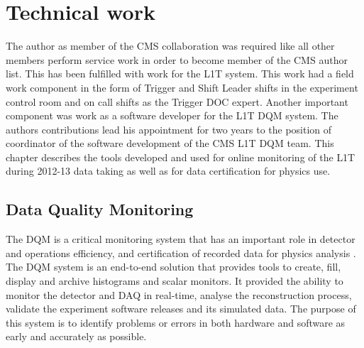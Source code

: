 \chapter{Technical work}
\label{CHAPTER:TechnicalWork}

\glsresetall %


The author as member of the \gls{CMS} collaboration was required like all other members perform service work in order to become member of the \gls{CMS} author list. This has been fulfilled with work for the \gls{L1T} system. This work had a field work component in the form of Trigger and Shift Leader shifts in the experiment control room and on call shifts as the Trigger \gls{DOC} expert. Another important component was work as a software developer for the \gls{L1T} \gls{DQM} system. The authors contributions lead his appointment for two years  to the position of coordinator of the software development of the \gls{CMS} \gls{L1T} \gls{DQM} team. This chapter describes the tools developed and used for online monitoring of the \gls{L1T} during 2012-13 data taking as well as for data certification for physics use.

\section{Data Quality Monitoring}
\label{SECTION:TechnicalWork_DataQualityMonitoring}


The \acrfull{DQM} is a critical monitoring system that has an important role in detector and operations efficiency, and certification of recorded data for physics analysis \cite{CMSTDR:CMSTridasTDRVol1,ARTICLE:CMSDataQualityMonitoringSoftWare_ExperienceAndFuture}. The \gls{DQM} system is an end-to-end solution that provides tools to create, fill, display and archive histograms and scalar monitors. It provided the ability to monitor the detector and \gls{DAQ} in real-time, analyse the reconstruction process, validate the experiment software releases and its simulated data. The purpose of this system is to identify problems or errors in both hardware and software as early and accurately as possible.

